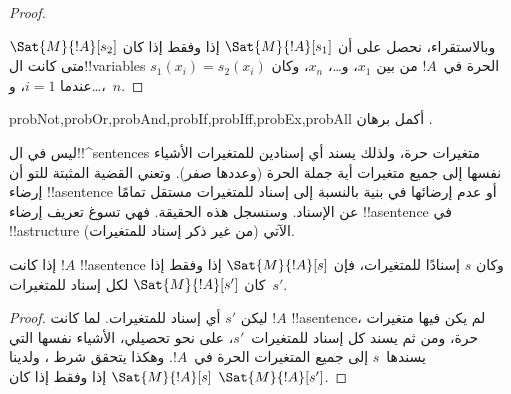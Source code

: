 \documentclass[../../../include/open-logic-section]{subfiles}
\begin{document}
\begin{proof}
\begin{enumerate}
\end{enumerate}
وبالاستقراء، نحصل على أن $\Sat{M}{!A}[s_1]$ إذا وفقط إذا كان
$\Sat{M}{!A}[s_2]$ متى كانت ال!!{variable}s الحرة في~$!A$ من بين
$x_1$، و\dots، $x_n$، وكان $s_1(x_i)=s_2(x_i)$ عندما $i = 1$،
و\dots،~$n$.
\end{proof}

\begin{probtag}{probNot,probOr,probAnd,probIf,probIff,probEx,probAll}
أكمل برهان .
\end{probtag}

\begin{explain}
ليس في ال!!^{sentence}s متغيرات حرة، ولذلك يسند أي إسنادين
للمتغيرات الأشياء نفسها إلى جميع متغيرات أية جملة الحرة (وعددها
صفر). وتعني القضية المثبتة للتو أن إرضاء !!a{sentence} أو عدم
إرضائها في بنية بالنسبة إلى إسناد للمتغيرات مستقل تمامًا عن
الإسناد. وسنسجل هذه الحقيقة. فهي تسوغ تعريف إرضاء !!a{sentence} في
!!a{structure} الآتي (من غير ذكر إسناد للمتغيرات).
\end{explain}

\begin{cor}
إذا كانت $!A$ !!a{sentence} وكان $s$ إسنادًا للمتغيرات، فإن
$\Sat{M}{!A}[s]$ إذا وفقط إذا كان $\Sat{M}{!A}[s']$ لكل إسناد
للمتغيرات~$s'$.
\end{cor}

\begin{proof}
  ليكن $s'$ أي إسناد للمتغيرات. لما كانت $!A$ !!a{sentence}، لم يكن
  فيها متغيرات حرة، ومن ثم يسند كل إسناد للمتغيرات~$s'$، على نحو
  تحصيلي، الأشياء نفسها التي يسندها~$s$ إلى جميع المتغيرات الحرة
  في~$!A$. وهكذا يتحقق شرط ، ولدينا
  $\Sat{M}{!A}[s]$ إذا وفقط إذا كان $\Sat{M}{!A}[s']$.
\end{proof}
\end{document}
